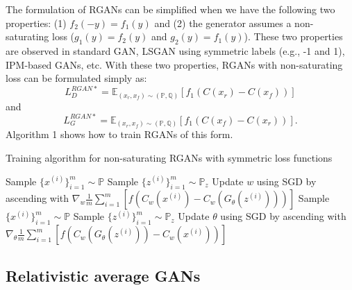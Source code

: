 \documentclass{article}
\begin{document}
The formulation of RGANs can be simplified when we have the following two properties: (1) $f_2(-y) = f_1(y)$ and (2) the generator assumes a non-saturating loss ($g_1(y)=f_2(y)$ and $g_2(y)=f_1(y)$). These two properties are observed in standard GAN, LSGAN using symmetric labels (e.g., -1 and 1), IPM-based GANs, etc. With these two properties, RGANs with non-saturating loss can be formulated simply as:
\begin{equation}
L_D^{RGAN*} = \mathbb{E}_{(x_r,x_f) \sim (\mathbb{P},\mathbb{Q})}\left[ f_1(C(x_r)-C(x_f)) \right]
\end{equation}
and
\begin{equation}
L_G^{RGAN*} = \mathbb{E}_{(x_r,x_f) \sim (\mathbb{P},\mathbb{Q})}\left[ f_1(C(x_f)-C(x_r)) \right].
\end{equation}
Algorithm 1 shows how to train RGANs of this form.
\begin{algorithm}  
	\caption{Training algorithm for non-saturating RGANs with symmetric loss functions
		\label{alg:1}}
	\begin{algorithmic}
		\State Sample $\{x^{(i)}\}_{i=1}^m \sim \mathbb{P}$
		\State Sample $\{z^{(i)}\}_{i=1}^m \sim \mathbb{P}_z$
		\State Update $w$ using SGD by ascending with $\nabla_{w} \frac{1}{m} \sum_{i=1}^{m} \left[ f(C_w(x^{(i)})-C_w(G_{\theta}(z^{(i)}))) \right]$
		\EndFor 
		\State Sample $\{x^{(i)}\}_{i=1}^m \sim \mathbb{P}$
		\State Sample $\{z^{(i)}\}_{i=1}^m \sim \mathbb{P}_z$
		\State Update $\theta$ using SGD by ascending with $\nabla_{\theta} \frac{1}{m} \sum_{i=1}^{m} \left[ f(C_w(G_{\theta}(z^{(i)}))-C_w(x^{(i)})) \right]$
		\EndWhile
	\end{algorithmic}
\end{algorithm}

\subsection{Relativistic average GANs}
\end{document}
